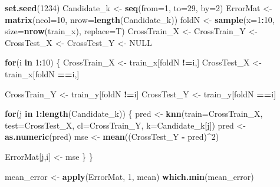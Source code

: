 \documentclass[]{article}
\newenvironment{Shaded}{\begin{snugshade}}{\end{snugshade}}
\newcommand{\ControlFlowTok}[1]{\textcolor[rgb]{0.13,0.29,0.53}{\textbf{#1}}}
\newcommand{\DataTypeTok}[1]{\textcolor[rgb]{0.13,0.29,0.53}{#1}}
\newcommand{\DecValTok}[1]{\textcolor[rgb]{0.00,0.00,0.81}{#1}}
\newcommand{\KeywordTok}[1]{\textcolor[rgb]{0.13,0.29,0.53}{\textbf{#1}}}
\newcommand{\NormalTok}[1]{#1}
\newcommand{\OperatorTok}[1]{\textcolor[rgb]{0.81,0.36,0.00}{\textbf{#1}}}
\newcommand{\OtherTok}[1]{\textcolor[rgb]{0.56,0.35,0.01}{#1}}
\newcommand{\StringTok}[1]{\textcolor[rgb]{0.31,0.60,0.02}{#1}}
\begin{document}
\begin{Shaded}
\begin{Highlighting}[]
\KeywordTok{set.seed}\NormalTok{(}\DecValTok{1234}\NormalTok{)}
\NormalTok{Candidate_k <-}\StringTok{ }\KeywordTok{seq}\NormalTok{(}\DataTypeTok{from=}\DecValTok{1}\NormalTok{, }\DataTypeTok{to=}\DecValTok{29}\NormalTok{, }\DataTypeTok{by=}\DecValTok{2}\NormalTok{)}
\NormalTok{ErrorMat <-}\StringTok{ }\KeywordTok{matrix}\NormalTok{(}\DataTypeTok{ncol=}\DecValTok{10}\NormalTok{, }\DataTypeTok{nrow=}\KeywordTok{length}\NormalTok{(Candidate_k))}
\NormalTok{foldN <-}\StringTok{ }\KeywordTok{sample}\NormalTok{(}\DataTypeTok{x=}\DecValTok{1}\OperatorTok{:}\DecValTok{10}\NormalTok{, }\DataTypeTok{size=}\KeywordTok{nrow}\NormalTok{(train_x), }\DataTypeTok{replace=}\NormalTok{T)}
\NormalTok{CrossTrain_X <-}\StringTok{ }\NormalTok{CrossTrain_Y <-}\StringTok{ }\NormalTok{CrossTest_X <-}\StringTok{ }\NormalTok{CrossTest_Y <-}\StringTok{ }\OtherTok{NULL}

\ControlFlowTok{for}\NormalTok{(i }\ControlFlowTok{in} \DecValTok{1}\OperatorTok{:}\DecValTok{10}\NormalTok{) \{}
\NormalTok{  CrossTrain_X <-}\StringTok{ }\NormalTok{train_x[foldN }\OperatorTok{!=}\NormalTok{i,]}
\NormalTok{  CrossTest_X <-}\StringTok{ }\NormalTok{train_x[foldN }\OperatorTok{==}\NormalTok{i,]}
  
\NormalTok{  CrossTrain_Y <-}\StringTok{ }\NormalTok{train_y[foldN }\OperatorTok{!=}\NormalTok{i]}
\NormalTok{  CrossTest_Y <-}\StringTok{ }\NormalTok{train_y[foldN }\OperatorTok{==}\NormalTok{i]}
  
  \ControlFlowTok{for}\NormalTok{(j }\ControlFlowTok{in} \DecValTok{1}\OperatorTok{:}\KeywordTok{length}\NormalTok{(Candidate_k)) \{}
\NormalTok{    pred <-}\StringTok{ }\KeywordTok{knn}\NormalTok{(}\DataTypeTok{train=}\NormalTok{CrossTrain_X, }\DataTypeTok{test=}\NormalTok{CrossTest_X, }\DataTypeTok{cl=}\NormalTok{CrossTrain_Y, }\DataTypeTok{k=}\NormalTok{Candidate_k[j])}
\NormalTok{    pred <-}\StringTok{ }\KeywordTok{as.numeric}\NormalTok{(pred)}
\NormalTok{    mse <-}\StringTok{ }\KeywordTok{mean}\NormalTok{((CrossTest_Y }\OperatorTok{-}\StringTok{ }\NormalTok{pred)}\OperatorTok{^}\DecValTok{2}\NormalTok{)}

\NormalTok{    ErrorMat[j,i] <-}\StringTok{ }\NormalTok{mse}
\NormalTok{  \}}
\NormalTok{\}}

\NormalTok{mean_error <-}\StringTok{ }\KeywordTok{apply}\NormalTok{(ErrorMat, }\DecValTok{1}\NormalTok{, mean)}
\KeywordTok{which.min}\NormalTok{(mean_error)}
\end{Highlighting}
\end{Shaded}
\end{document}
